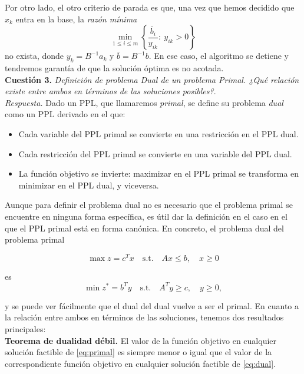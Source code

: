 \documentclass[11pt,a4paper]{article}
\begin{document}
Por otro lado, el otro criterio de parada es que, una vez que hemos decidido que $x_k$ entra en la base, la \textit{razón mínima}
\[
\min_{1\leq i \leq m} \left\{ \frac{\bar b_i}{y_{ik}}: \ y_{ik}>0\right\}
\]
no exista, donde $y_k=B^{-1}a_k$ y $\bar b = B^{-1}b$. En ese caso, el algoritmo se detiene y tendremos garantía de que la solución óptima es no acotada.\\

\textbf{Cuestión 3.} \emph{Definición de problema Dual de un problema Primal. ¿Qué relación existe entre ambos en términos de las soluciones posibles?}.\\

\textit{Respuesta.} Dado un PPL, que llamaremos \textit{primal}, se define su problema \textit{dual} como un PPL derivado en el que:
\begin{itemize}
  \item Cada variable del PPL primal se convierte en una restricción en el PPL dual.
  \item Cada restricción del PPL primal se convierte en una variable del PPL dual.
  \item La función objetivo se invierte: maximizar en el PPL primal se transforma en minimizar en el PPL dual, y viceversa.
\end{itemize}

Aunque para definir el problema dual no es necesario que el problema primal se encuentre en ninguna forma específica, es útil dar la definición en el caso en el que el PPL primal está en forma canónica. En concreto, el problema dual del problema primal

\begin{equation}
  \label{eq:primal}
  \tag{PP}
\max z=c^Tx \quad \text{s.t.} \quad Ax\leq b, \quad x\geq 0
\end{equation}

es
\begin{equation}
  \label{eq:dual}
  \tag{PD}
\min z^{\ast}=b^Ty \quad \text{s.t.} \quad A^Ty\geq c, \quad y\geq 0,
\end{equation}

y se puede ver fácilmente que el dual del dual vuelve a ser el primal. En cuanto a la relación entre ambos en términos de las soluciones, tenemos dos resultados principales:\\

\textbf{Teorema de dualidad débil.} El valor de la función objetivo en cualquier solución factible de \eqref{eq:primal} es siempre menor o igual que el valor de la correspondiente función objetivo en cualquier solución factible de \eqref{eq:dual}.\\
\end{document}
